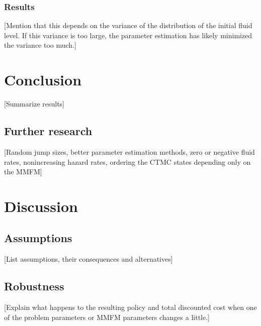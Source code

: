 \subsection{Results}
[Mention that this depends on the variance of the distribution of the initial fluid level. If this variance is too large, the parameter estimation has likely minimized the variance too much.]

\chapter{Conclusion}
[Summarize results]
\section{Further research}
[Random jump sizes, better parameter estimation methods, zero or negative fluid rates, nonincreasing hazard rates, ordering the CTMC states depending only on the MMFM]

\chapter{Discussion}
\section{Assumptions}
[List assumptions, their consequences and alternatives]
\section{Robustness}
[Explain what happens to the resulting policy and total discounted cost when one of the problem parameters or MMFM parameters changes a little.]




